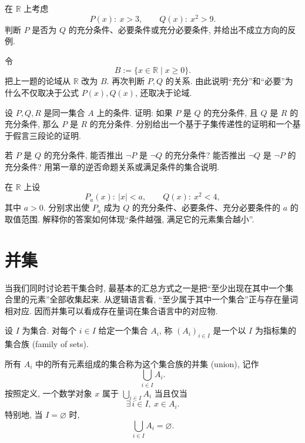 \documentclass[usesamecnt, thmcnt=section, lang=cn, newtx, 10pt, scheme=chinese]{elegantbook}
\begin{document}
\begin{exercise}\label{ex:sets-condition-01}
在 $\mathbb R$ 上考虑
\[
 P(x):\ x>3,
 \qquad
 Q(x):\ x^2>9.
\]
判断 $P$ 是否为 $Q$ 的充分条件、必要条件或充分必要条件, 并给出不成立方向的反例.
\end{exercise}

\begin{exercise}\label{ex:sets-condition-02}
令
\[
 B:=\{x\in\mathbb R\mid x\geq0\}.
\]
把上一题的论域从 $\mathbb R$ 改为 $B$. 再次判断 $P,Q$ 的关系. 由此说明``充分''和``必要''为什么不仅取决于公式 $P(x),Q(x)$, 还取决于论域.
\end{exercise}

\begin{exercise}\label{ex:sets-condition-03}
设 $P,Q,R$ 是同一集合 $A$ 上的条件. 证明: 如果 $P$ 是 $Q$ 的充分条件, 且 $Q$ 是 $R$ 的充分条件, 那么 $P$ 是 $R$ 的充分条件. 分别给出一个基于子集传递性的证明和一个基于假言三段论的证明.
\end{exercise}

\begin{exercise}\label{ex:sets-condition-04}
若 $P$ 是 $Q$ 的充分条件, 能否推出 $\neg P$ 是 $\neg Q$ 的充分条件? 能否推出 $\neg Q$ 是 $\neg P$ 的充分条件? 用第一章的逆否命题关系或满足条件的集合说明.
\end{exercise}

\begin{challenge}\label{ch:sets-04}
在 $\mathbb R$ 上设
\[
 P_a(x):\ |x|<a,
 \qquad
 Q(x):\ x^2<4,
\]
其中 $a>0$. 分别求出使 $P_a$ 成为 $Q$ 的充分条件、必要条件、充分必要条件的 $a$ 的取值范围. 解释你的答案如何体现``条件越强, 满足它的元素集合越小''.
\end{challenge}

\section{并集}

当我们同时讨论若干集合时, 最基本的汇总方式之一是把``至少出现在其中一个集合里的元素''全部收集起来. 从逻辑语言看, ``至少属于其中一个集合''正与存在量词相对应. 因而并集可以看成存在量词在集合语言中的对应物.

\begin{definition}[集合族与并集]\label{def:sets-union}
设 $I$ 为集合. 对每个 $i\in I$ 给定一个集合 $A_i$, 称 $(A_i)_{i\in I}$ 是一个以 $I$ 为指标集的{\color{blue}集合族 (family of sets)}.

所有 $A_i$ 中的所有元素组成的集合称为这个集合族的{\color{blue}并集 (union)}, 记作
\[
 \bigcup_{i\in I}A_i.
\]
按照定义, 一个数学对象 $x$ 属于 $\bigcup_{i\in I}A_i$ 当且仅当
\[
 \exists\,i\in I,\ x\in A_i.
\]
特别地, 当 $I=\varnothing$ 时,
\[
 \bigcup_{i\in I}A_i=\varnothing.
\]
\end{definition}
\end{document}

